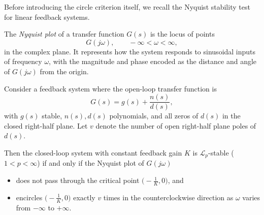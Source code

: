 Before introducing the circle criterion itself, we recall the Nyquist stability test for linear feedback systems.

\begin{definition}
The \emph{Nyquist plot} of a transfer function $G(s)$ is the locus of points
\[
G(j\omega), \qquad -\infty < \omega < \infty,
\]
in the complex plane.  
It represents how the system responds to sinusoidal inputs of frequency $\omega$, with the magnitude and phase encoded as the distance and angle of $G(j\omega)$ from the origin.
\end{definition}

\begin{proposition}
Consider a feedback system where the open-loop transfer function is
\[
G(s) = g(s) + \frac{n(s)}{d(s)},
\]
with $g(s)$ stable, $n(s), d(s)$ polynomials, and all zeros of $d(s)$ in the closed right-half plane.  
Let $v$ denote the number of open right-half plane poles of $d(s)$.  

Then the closed-loop system with constant feedback gain $K$ is $\mathcal{L}_p$-stable ($1<p<\infty$) if and only if the Nyquist plot of $G(j\omega)$
\begin{itemize}
    \item does not pass through the critical point $\big(-\tfrac{1}{K},0\big)$, and  
    \item encircles $\big(-\tfrac{1}{K},0\big)$ exactly $v$ times in the counterclockwise direction as $\omega$ varies from $-\infty$ to $+\infty$.
\end{itemize}
\end{proposition}

